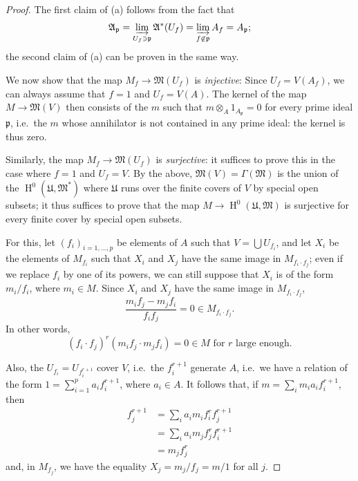 \documentclass[british]{article}
\newcommand{\oldpage}[1]{\marginpar{\footnotesize$\Big\vert$ \textit{p.~#1}}}
\begin{document}
\begin{proof}
The first claim of (a) follows from the fact that \[
  \mathfrak{A}_\mathfrak{p}
  = \varinjlim_{U_f\ni\mathfrak{p}} \mathfrak{A}^*(U_f)
  = \varinjlim_{f\not\in\mathfrak{p}} A_f
  = A_\mathfrak{p};
\] the second claim of (a) can be proven in the same way.

We now show that the map \(M_f\to\mathfrak{M}(U_f)\) is
\emph{injective}: Since \(U_f=V(A_f)\), we can always assume that
\(f=1\) and \(U_f=V(A)\). The kernel of the map \(M\to\mathfrak{M}(V)\)
then consists of the \(m\) such that \(m\otimes_A1_{A_\mathfrak{p}}=0\)
for every prime ideal \(\mathfrak{p}\), i.e.~the \(m\) whose annihilator
is not contained in any prime ideal: the kernel is thus zero.

Similarly, the map \(M_f\to\mathfrak{M}(U_f)\) is \emph{surjective}: it
suffices to prove this in the case where \(f=1\) and \(U_f=V\). By the
above, \(\mathfrak{M}(V)=\Gamma(\mathfrak{M})\) is the union of the
\(\operatorname{H}^0(\mathfrak{U},\mathfrak{M}^*)\) where
\(\mathfrak{U}\) runs over the finite covers of \(V\) by special open
subsets; it thus suffices to prove that the map
\(M\to\operatorname{H}^0(\mathfrak{U},\mathfrak{M})\) is surjective for
every finite cover by special open subsets.

For this, let \((f_i)_{i=1,\ldots,p}\) be elements of \(A\) such that
\(V=\bigcup U_{f_i}\), and let \(X_i\) be the elements of \(M_{f_i}\)
such that \(X_i\) and \(X_j\) have the same image in
\(M_{f_i\cdot f_j}\); even if we replace \(f_i\) by one of its powers,
we can still suppose that \(X_i\) is of the form \(m_i/f_i\), where
\(m_i\in M\). Since \(X_i\) and \(X_j\) have the same image in
\(M_{f_i\cdot f_j}\), \[
  \frac{m_i f_j - m_j f_i}{f_i f_j} = 0 \in M_{f_i\cdot f_j}.
\] \oldpage{1-06} In other words, \[
  (f_i\cdot f_j)^r(m_if_j\cdot m_jf_i) = 0 \in M\text{ for }r\text{ large enough.}
\]

Also, the \(U_{f_i}=U_{f_i^{r+1}}\) cover \(V\), i.e.~the \(f_i^{r+1}\)
generate \(A\), i.e.~we have a relation of the form
\(1=\sum_{i=1}^p a_i f_i^{r+1}\), where \(a_i\in A\). It follows that,
if \(m=\sum_i m_ia_if_i^{r+1}\), then \[
  \begin{aligned}
    f_j^{r+1}
    &= \sum_i a_im_if_i^rf_j^{r+1}
  \\&= \sum_i a_im_jf_j^rf_i^{r+1}
  \\&= m_jf_j^r
  \end{aligned}
\] and, in \(M_{f_j}\), we have the equality \(X_j=m_j/f_j=m/1\) for all
\(j\).
\end{proof}
\end{document}
